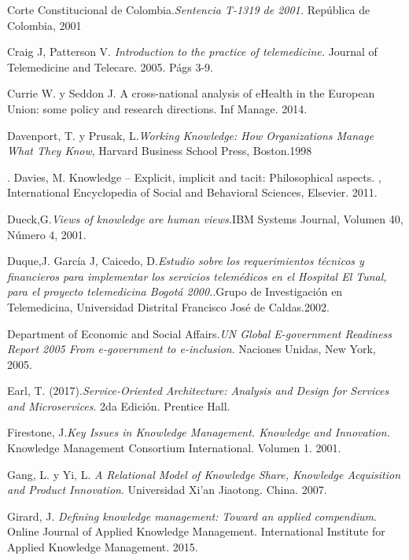 \begin{thebibliography}{}
 Corte Constitucional de Colombia.\textit{Sentencia T-1319 de 2001.} República de Colombia, 2001

 Craig J, Patterson V. \textit{Introduction to the practice of telemedicine.} Journal of Telemedicine and Telecare. 2005. Págs 3-9.

 Currie W. y Seddon J. A cross-national analysis of eHealth in the European Union: some policy and research directions. Inf Manage. 2014.

 Davenport, T. y Prusak, L.\textit{Working Knowledge: How Organizations Manage What They Know}, Harvard Business School Press, Boston.1998

. Davies, M. Knowledge – Explicit, implicit and tacit: Philosophical aspects. , International Encyclopedia of Social and Behavioral Sciences, Elsevier. 2011.

 Dueck,G.\textit{Views of knowledge are human views.}IBM Systems Journal, Volumen 40, Número 4, 2001.

 Duque,J. García J, Caicedo, D.\textit{Estudio sobre los requerimientos técnicos y financieros para implementar los servicios telemédicos en el Hospital El Tunal,  para el proyecto telemedicina Bogotá 2000.}.Grupo de Investigación en Telemedicina,  Universidad Distrital Francisco José de Caldas.2002.

 Department of Economic and Social Affairs.\textit{UN Global E-government Readiness Report 2005 From e-government to e-inclusion}. Naciones Unidas, New York, 2005.

 Earl, T. (2017).\textit{Service-Oriented Architecture: Analysis and Design for Services and Microservices}. 2da Edición. Prentice Hall.

 Firestone, J.\textit{Key Issues in Knowledge Management. Knowledge and Innovation.} Knowledge Management Consortium International. Volumen 1. 2001.

 Gang, L. y Yi, L. \textit{A Relational Model of Knowledge Share, Knowledge Acquisition and Product Innovation}. Universidad Xi'an Jiaotong. China. 2007.

 Girard, J. \textit{Defining knowledge management: Toward an applied compendium}. Online Journal of Applied Knowledge Management. International Institute for Applied Knowledge Management. 2015.


\end{thebibliography}
